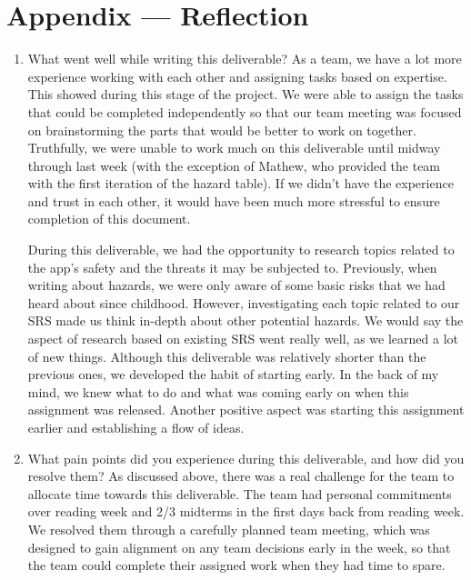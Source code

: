 \documentclass{article}
\begin{document}
\newpage{}

\section*{Appendix --- Reflection}



\begin{enumerate}
    \item What went well while writing this deliverable?
    As a team, we have a lot more experience working with each other and assigning tasks based on expertise. This showed during this stage of the project. We were able to
    assign the tasks that could be completed independently so that our team meeting was focused on brainstorming the parts that would be better to work on together. Truthfully, we 
    were unable to work much on this deliverable until midway through last week (with the exception of Mathew, who provided the team with the first iteration of the hazard table). If we 
    didn't have the experience and trust in each other, it would have been much more stressful to ensure completion of this document.
    
    During this deliverable, we had the opportunity to research topics related to the app’s safety and the threats it may be subjected to. Previously, when writing about hazards, 
    we were only aware of some basic risks that we had heard about since childhood. However, investigating each topic related to our SRS made us think in-depth about other potential hazards. 
    We would say the aspect of research based on existing SRS went really well, as we learned a lot of new things. Although this deliverable was relatively shorter than the previous ones, we developed the habit of starting early. In the back of my mind, we knew what to 
    do and what was coming early on when this assignment was released. Another positive aspect was starting this assignment earlier and establishing a flow of ideas.

    \item What pain points did you experience during this deliverable, and how
    did you resolve them?
    As discussed above, there was a real challenge for the team to allocate time towards this deliverable. The team had personal commitments over reading week
    and 2/3 midterms in the first days back from reading week. We resolved them through a carefully planned team meeting, which was designed to gain alignment on any team decisions
    early in the week, so that the team could complete their assigned work when they had time to spare.


\end{enumerate}
\end{document}
